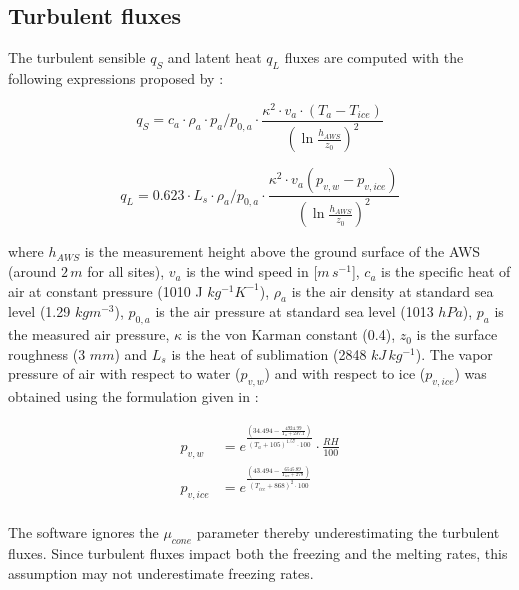 \documentclass[utf8]{frontiersSCNS}
\begin{document}
\subsection{Turbulent fluxes} \label{sec:Qs}

The turbulent sensible $q_{S}$ and latent heat $q_{L}$ fluxes are computed with the following expressions
proposed by \cite{garrattAtmosphericBoundaryLayer1992}:

\begin{equation}
	q_{S}= c_{a} \cdot \rho_{a} \cdot p_{a}/p_{0,a} \cdot \frac{\kappa^2 \cdot v_a \cdot
		(T_a-T_{ice})}{{(\ln{\frac{h_{AWS}}{z_{0}}})}^2}
	\label{eqn:qs}
\end{equation}

\begin{equation}
	q_{L}= 0.623 \cdot L_s \cdot \rho_{a}/p_{0,a} \cdot \frac{\kappa^2 \cdot
	v_a(p_{v,w}-p_{v,ice})}{{(\ln{\frac{h_{AWS}}{z_{0}}})}^2}
\end{equation}

where $h_{AWS}$ is the measurement height above the ground surface of the AWS (around $2\,m$ for all sites),
$v_a$ is the wind speed in [$m\,s^{-1}$], $c_a$ is the specific heat of air at constant pressure (1010 J
$kg^{-1} K^{-1}$), $\rho_{a}$ is the air density at standard sea level (1.29 $kg m^{-3}$), $p_{0,a}$ is the air
pressure at standard sea level (1013 $hPa$), $p_{a}$ is the measured air pressure, $\kappa$ is the von Karman
constant (0.4), $z_{0}$ is the surface roughness (3 $mm$) and $L_s$ is the heat of sublimation (2848
$kJ\,kg^{-1}$).  The vapor pressure of air with respect to water ($p_{v,w}$) and with respect to ice
($p_{v,ice}$) was obtained using the formulation given in \cite{huangSimpleAccurateFormula2018} :

\begin{equation}
	\begin{split}
		p_{v,w}&=e^{\frac{(34.494 - \frac{4924.99}{T_{a} + 237.1})}{(T_a + 105)^{1.57} \cdot 100}} \cdot \frac{RH}{100} \\
		p_{v,ice}&=e^{\frac{(43.494 - \frac{6545.89}{T_{ice} + 278})}{(T_{ice} + 868)^{2} \cdot 100}} \\
	\end{split} \label{eqn:vp}
\end{equation}

The software ignores the $\mu_{cone}$ parameter thereby underestimating the turbulent fluxes. Since turbulent
fluxes impact both the freezing and the melting rates, this assumption may not underestimate freezing rates.
\end{document}
